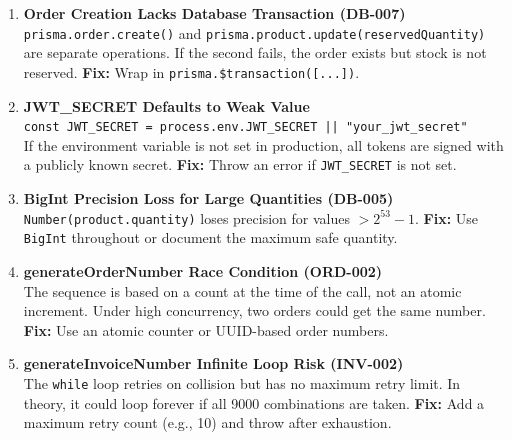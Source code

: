 \documentclass[12pt,a4paper]{report}
\begin{document}
\begin{tcolorbox}[criticalbox, title={Critical Risks Identified During White Box Analysis}]
\begin{enumerate}
  \item \textbf{Order Creation Lacks Database Transaction (DB-007)} \\
  \texttt{prisma.order.create()} and \texttt{prisma.product.update(reservedQuantity)} are
  separate operations. If the second fails, the order exists but stock is not reserved.
  \textbf{Fix:} Wrap in \texttt{prisma.\$transaction([...])}.

  \item \textbf{JWT\_SECRET Defaults to Weak Value} \\
  \texttt{const JWT\_SECRET = process.env.JWT\_SECRET || "your\_jwt\_secret"} \\
  If the environment variable is not set in production, all tokens are signed with a
  publicly known secret. \textbf{Fix:} Throw an error if \texttt{JWT\_SECRET} is not set.

  \item \textbf{BigInt Precision Loss for Large Quantities (DB-005)} \\
  \texttt{Number(product.quantity)} loses precision for values $> 2^{53} - 1$.
  \textbf{Fix:} Use \texttt{BigInt} throughout or document the maximum safe quantity.

  \item \textbf{generateOrderNumber Race Condition (ORD-002)} \\
  The sequence is based on a count at the time of the call, not an atomic increment.
  Under high concurrency, two orders could get the same number.
  \textbf{Fix:} Use an atomic counter or UUID-based order numbers.

  \item \textbf{generateInvoiceNumber Infinite Loop Risk (INV-002)} \\
  The \texttt{while} loop retries on collision but has no maximum retry limit.
  In theory, it could loop forever if all 9000 combinations are taken.
  \textbf{Fix:} Add a maximum retry count (e.g., 10) and throw after exhaustion.
\end{enumerate}
\end{tcolorbox}

\end{document}
